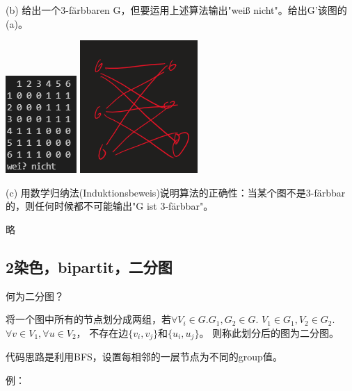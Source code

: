 \documentclass[a4paper]{article}    %
\begin{document}
(b) 给出一个3-färbbaren G，但要运用上述算法输出"weiß nicht"。给出G'该图的(a)。

\begin{center}
    \includegraphics[scale=0.6]{10.png}
    \includegraphics[scale=0.6]{11.png}
\end{center}

(c) 用数学归纳法(Induktionsbeweis)说明算法的正确性：当某个图不是3-färbbar的，则任何时候都不可能输出"G ist 3-färbbar"。

略

\subsection{2染色，bipartit，二分图} \noindent 何为二分图？

将一个图中所有的节点划分成两组，若$\forall V_i \in G. G_1,G_2 \in G$. $V_1 \in G_1, V_2 \in G_2$. 
$\forall v \in V_1, \forall u \in V_2$，
不存在边$\{v_i,v_j\}$和$\{u_i,u_j\}$。
则称此划分后的图为二分图。

代码思路是利用BFS，设置每相邻的一层节点为不同的group值。

\noindent 例：
\end{document}
